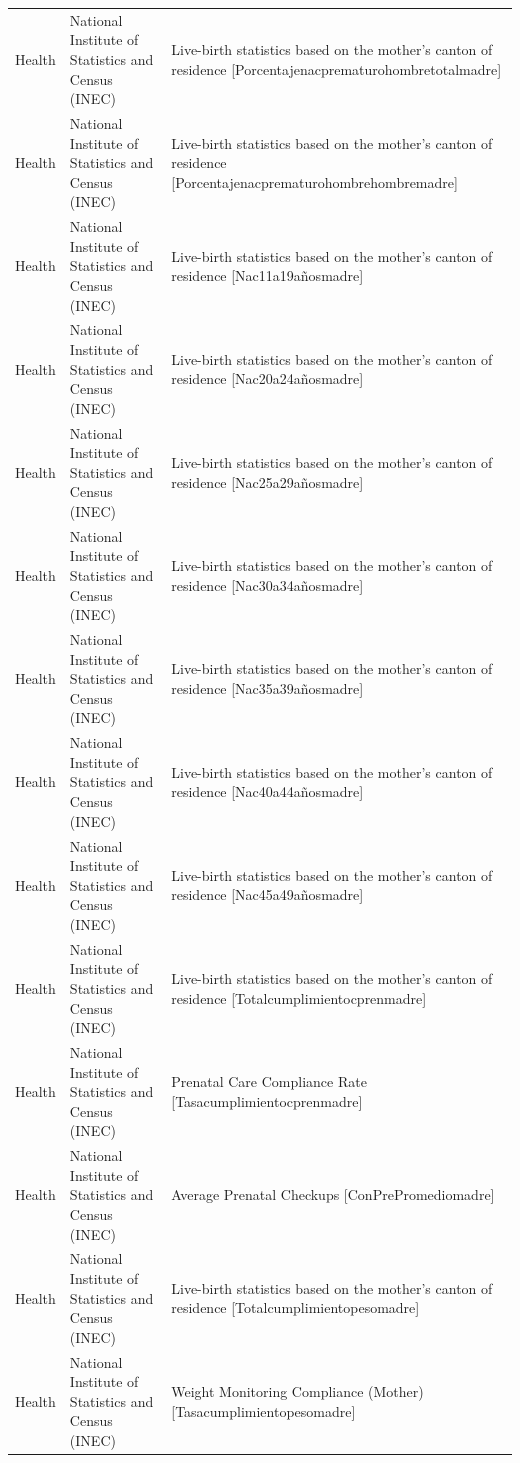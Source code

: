 \begin{landscape}
\begin{longtable}[t]{>{\raggedright\arraybackslash}p{3.4cm}>{\raggedright\arraybackslash}p{5.6cm}>{\raggedright\arraybackslash}p{12.4cm}}
Health & National Institute of Statistics and Census (INEC) & Live-birth statistics based on the mother's canton of residence [Porcentajenacprematuro\allowbreak{}hombretotalmadre]\\
Health & National Institute of Statistics and Census (INEC) & Live-birth statistics based on the mother's canton of residence [Porcentajenacprematuro\allowbreak{}hombrehombremadre]\\
Health & National Institute of Statistics and Census (INEC) & Live-birth statistics based on the mother's canton of residence [Nac11a19añosmadre]\\
Health & National Institute of Statistics and Census (INEC) & Live-birth statistics based on the mother's canton of residence [Nac20a24añosmadre]\\
Health & National Institute of Statistics and Census (INEC) & Live-birth statistics based on the mother's canton of residence [Nac25a29añosmadre]\\
Health & National Institute of Statistics and Census (INEC) & Live-birth statistics based on the mother's canton of residence [Nac30a34añosmadre]\\
Health & National Institute of Statistics and Census (INEC) & Live-birth statistics based on the mother's canton of residence [Nac35a39añosmadre]\\
Health & National Institute of Statistics and Census (INEC) & Live-birth statistics based on the mother's canton of residence [Nac40a44añosmadre]\\
Health & National Institute of Statistics and Census (INEC) & Live-birth statistics based on the mother's canton of residence [Nac45a49añosmadre]\\
Health & National Institute of Statistics and Census (INEC) & Live-birth statistics based on the mother's canton of residence [Totalcumplimientocpren\allowbreak{}madre]\\
Health & National Institute of Statistics and Census (INEC) & Prenatal Care Compliance Rate [Tasacumplimientocprenm\allowbreak{}adre]\\
Health & National Institute of Statistics and Census (INEC) & Average Prenatal Checkups [ConPrePromediomadre]\\
Health & National Institute of Statistics and Census (INEC) & Live-birth statistics based on the mother's canton of residence [Totalcumplimientopesom\allowbreak{}adre]\\
Health & National Institute of Statistics and Census (INEC) & Weight Monitoring Compliance (Mother) [Tasacumplimientopesoma\allowbreak{}dre]\\

\end{longtable}
\end{landscape}
